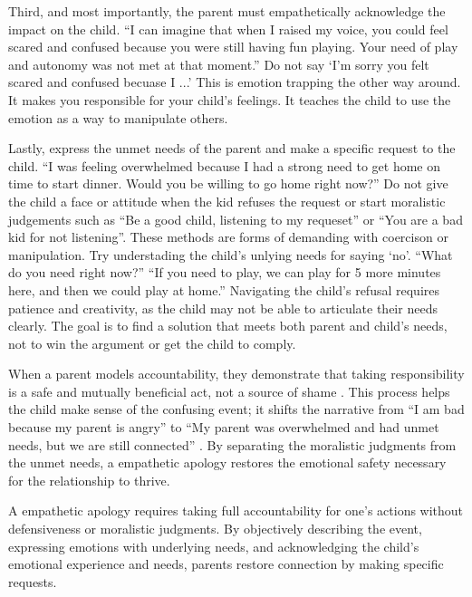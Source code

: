 Third, and most importantly, the parent must empathetically acknowledge the impact on the child.
``I can imagine that when I raised my voice, you could feel scared and confused because you were still having fun playing.
Your need of play and autonomy was not met at that moment.''
Do not say `I'm sorry you felt scared and confused becuase I ...'
This is emotion trapping the other way around.
It makes you responsible for your child's feelings.
It teaches the child to use the emotion as a way to manipulate others.

Lastly, express the unmet needs of the parent and make a specific request to the child.
``I was feeling overwhelmed because I had a strong need to get home on time to start dinner.
Would you be willing to go home right now?''
Do not give the child a face or attitude when the kid refuses the request or start moralistic judgements such as ``Be a good child, listening to my requeset'' or ``You are a bad kid for not listening''.
These methods are forms of demanding with coercison or manipulation.
Try understading the child's unlying needs for saying `no'.
``What do you need right now?'' ``If you need to play, we can play for 5 more minutes here, and then we could play at home.''
Navigating the child's refusal requires patience and creativity, as the child may not be able to articulate their needs clearly.
The goal is to find a solution that meets both parent and child's needs, not to win the argument or get the child to comply.

When a parent models accountability, they demonstrate that taking responsibility is a safe and mutually beneficial act, not a source of shame \citep{brown2012}.
This process helps the child make sense of the confusing event; it shifts the narrative from ``I am bad because my parent is angry'' to ``My parent was overwhelmed and had unmet needs, but we are still connected'' \citep{siegel2003}.
By separating the moralistic judgments from the unmet needs, a empathetic apology restores the emotional safety necessary for the relationship to thrive.

\begin{keyinsight}
A empathetic apology requires taking full accountability for one's actions without defensiveness or moralistic judgments.
By objectively describing the event, expressing emotions with underlying needs, and acknowledging the child's emotional experience and needs, parents restore connection by making specific requests.
\end{keyinsight}

